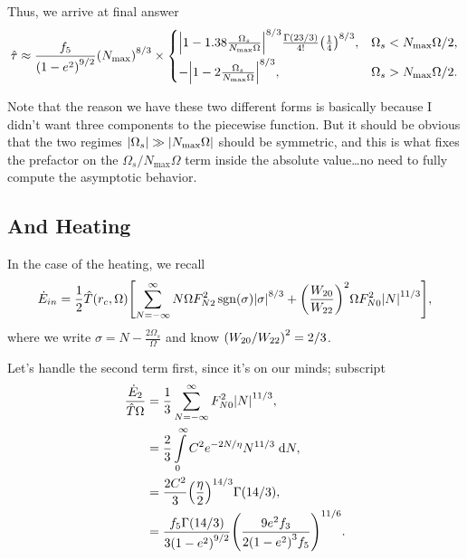 \documentclass[11pt,
        usenames, %
        dvipsnames %
    ]{article}
\DeclareMathOperator{\sgn}{sgn}
\DeclarePairedDelimiter\abs{\lvert}{\rvert}
\DeclarePairedDelimiter\p{\lparen}{\rparen}
\DeclarePairedDelimiter\s{\lbrack}{\rbrack}
\begin{document}
Thus, we arrive at final answer
\begin{equation}
    \hat{\tau} \approx
        \frac{f_5}{\p*{1 - e^2}^{9/2}}\p*{N_{\max}}^{8/3} \times
    \begin{cases}
        \abs*{1 - 1.38\frac{\Omega_s}{N_{\max}\Omega}}^{8/3}
            \frac{\Gamma(23/3)}{4!}\p*{\frac{1}{4}}^{8/3},
            & \Omega_s < N_{\max}\Omega / 2,\\[5pt]
        -\abs*{1 - 2\frac{\Omega_s}{N_{\max}\Omega}}^{8/3},
            & \Omega_s > N_{\max}\Omega / 2.
    \end{cases}\label{eq:traveling_torque}
\end{equation}

Note that the reason we have these two different forms is basically because I
didn't want three components to the piecewise function. But it should be obvious
that the two regimes $\abs*{\Omega_s} \gg \abs*{N_{\max}\Omega}$ should be
symmetric, and this is what fixes the prefactor on the $\Omega_s /
N_{\max}\Omega$ term inside the absolute value\dots no need to fully compute the
asymptotic behavior.

\subsection{And Heating}

In the case of the heating, we recall
\begin{align}
     \dot{E}_{in} = \frac{1}{2}\hat{T}\p*{r_c, \Omega}\s*{
         \sum\limits_{N = -\infty}^\infty
            N\Omega F_{N2}^2 \sgn \p*{\sigma} \abs*{\sigma}^{8/3}
            + \p*{\frac{W_{20}}{W_{22}}}^2\Omega F_{N0}^2 \abs*{N}^{11/3}},
\end{align}
where we write $\sigma = N - \frac{2\Omega_s}{\Omega}$ and know $\p*{W_{20} /
W_{22}}^2 = 2/3$.

Let's handle the second term first, since it's on our minds; subscript
\begin{align}
    \frac{\dot{E}_2}{\hat{T}\Omega}
        &= \frac{1}{3} \sum\limits_{N = -\infty}^\infty
            F_{N0}^2\abs*{N}^{11/3},\\
        &= \frac{2}{3}\int\limits_0^\infty C^2e^{-2N/\eta}N^{11/3}
            \;\mathrm{d}N,\\
        &= \frac{2C^2}{3}\p*{\frac{\eta}{2}}^{14/3}\Gamma(14/3),\\
        &= \frac{f_5\Gamma(14/3)}{3\p*{1 - e^2}^{9/2}}
            \p*{\frac{9e^2f_3}{2\p*{1 - e^2}^3 f_5}}^{11/6}.
\end{align}
\end{document}
